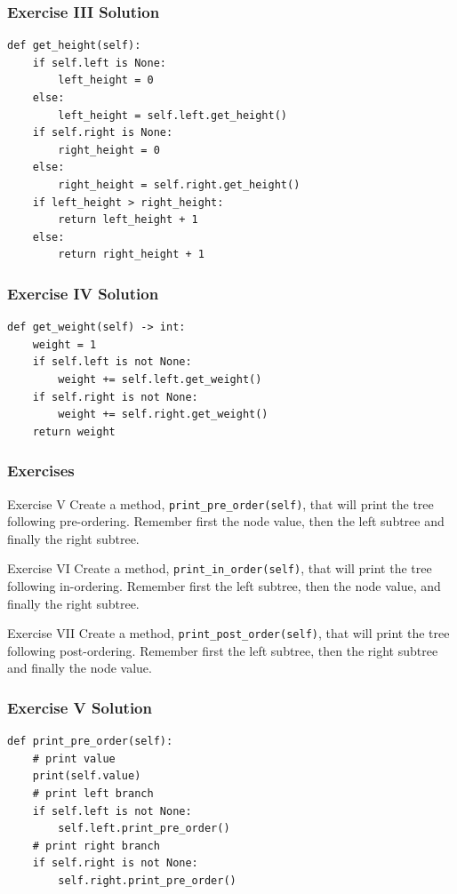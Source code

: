 \documentclass[11pt]{beamer}
\begin{document}
\begin{frame}[fragile]\frametitle{Exercise III Solution}
\begin{lstlisting}
def get_height(self):
    if self.left is None:
        left_height = 0
    else:
        left_height = self.left.get_height()
    if self.right is None:
        right_height = 0
    else:
        right_height = self.right.get_height()
    if left_height > right_height:
        return left_height + 1
    else:
        return right_height + 1
\end{lstlisting}
\end{frame}

\begin{frame}[fragile]\frametitle{Exercise IV Solution}
\begin{lstlisting}
def get_weight(self) -> int:
    weight = 1
    if self.left is not None:
        weight += self.left.get_weight()
    if self.right is not None:
        weight += self.right.get_weight()
    return weight
\end{lstlisting}
\end{frame}

\begin{frame}\frametitle{Exercises}
\begin{block}{Exercise V}
Create a method, \lstinline|print_pre_order(self)|, that will print the tree following pre-ordering. Remember first the node value, then the left subtree and finally the right subtree.
\end{block}
\begin{block}{Exercise VI}
Create a method, \lstinline|print_in_order(self)|, that will print the tree following in-ordering. Remember first the left subtree, then the node value, and finally the right subtree.
\end{block}
\begin{block}{Exercise VII}
Create a method, \lstinline|print_post_order(self)|, that will print the tree following post-ordering. Remember first the left subtree, then the right subtree and finally the node value.
\end{block}
\end{frame}

\begin{frame}[fragile]\frametitle{Exercise V Solution}
\begin{lstlisting}
def print_pre_order(self):
    # print value
    print(self.value)
    # print left branch
    if self.left is not None:
        self.left.print_pre_order()
    # print right branch
    if self.right is not None:
        self.right.print_pre_order()
\end{lstlisting}
\end{frame}
\end{document}
